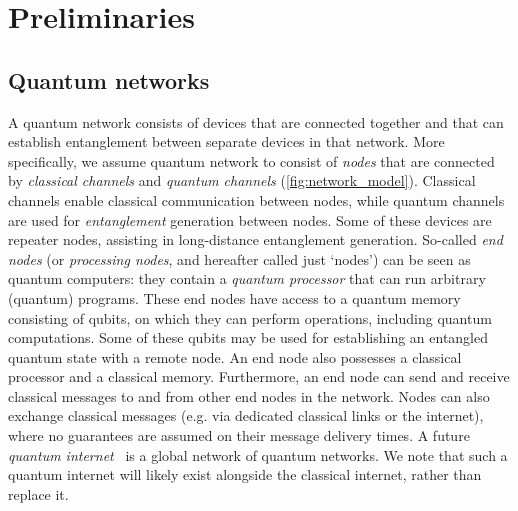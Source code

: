 \chapter
 [Preliminaries]
 {Preliminaries}
\label{chp:background}



\section{Quantum networks}
A quantum network consists of devices that are connected together and that can establish entanglement between separate devices in that network.
More specifically, we assume quantum network to consist of \textit{nodes} that are connected by \textit{classical channels} and \textit{quantum channels} (\cref{fig:network_model}).
Classical channels enable classical communication between nodes, while quantum channels are used for \textit{entanglement} generation between nodes.
Some of these devices are repeater nodes, assisting in long-distance entanglement generation.
So-called \textit{end nodes} (or \textit{processing nodes}, and hereafter called just `nodes') can be seen as quantum computers:
they contain a \textit{quantum processor} that can run arbitrary (quantum) programs.
These end nodes have access to a quantum memory consisting of qubits, on which they can perform operations, including quantum computations.
Some of these qubits may be used for establishing an entangled quantum state with a remote node.
An end node also possesses a classical processor and a classical memory.
Furthermore, an end node can send and receive classical messages to and from other end nodes in the network.
Nodes can also exchange classical messages (e.g. via dedicated classical links or the internet), where no guarantees are assumed on their message delivery times. 
A future \textit{quantum internet}~\cite{Wehner2018stages, kimble2008quantum} is a global network of quantum networks.
We note that such a quantum internet will likely exist alongside the classical internet, rather than replace it.

